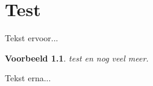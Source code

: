\documentclass[a4paper,12pt,dutch]{book}
\theoremstyle{break}
\newtheorem{example}{Voorbeeld}[chapter]
\begin{document}
\tableofcontents

\chapter{Test}

Tekst ervoor...
\begin{example}
test en nog veel meer.
\end{example}
Tekst erna...
\end{document}
